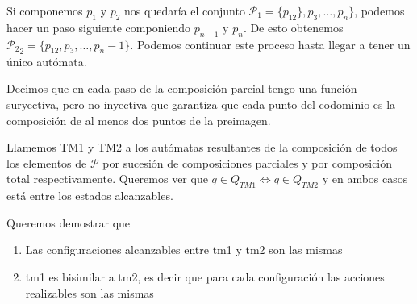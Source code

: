 Si componemos $p_1$ y $p_2$ nos quedaría el conjunto $\mathcal{P}_1 =\{ p_{12} \}, p_3, \ldots, p_n \} $, podemos hacer un paso siguiente componiendo $p_{n-1}$ y $p_n$. De esto obtenemos $\mathcal{P_2}_2= \{ p_{12}, p_3, \ldots, p_n-1 \} $. Podemos continuar este proceso hasta llegar a tener un único autómata. %

Decimos que en cada paso de la composición parcial tengo una función suryectiva, pero no inyectiva que garantiza que cada punto del codominio es la composición de al menos dos puntos de la preimagen.

Llamemos TM1 y TM2 a los autómatas resultantes de la composición de todos los elementos de $\mathcal{P}$ por sucesión de composiciones parciales y por composición total respectivamente. Queremos ver que $ q \in Q_{TM1} \iff q \in Q_{TM2} $ y en ambos casos está entre los estados alcanzables. 

Queremos demostrar que
\begin{enumerate}
\item Las configuraciones alcanzables entre tm1 y tm2 son las mismas
\item tm1 es bisimilar a tm2, es decir que para cada configuración las acciones realizables son las mismas
\end{enumerate}


